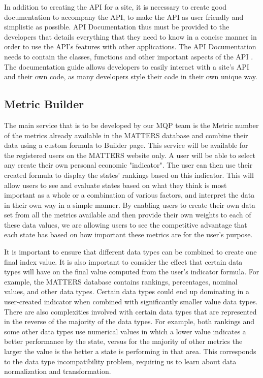 		In addition to creating the API for a site, it is necessary to create 
		good documentation to accompany the API, to make the API as user 
		friendly and simplistic as possible. API Documentation thus must be 
		provided to the developers that details everything that they need to 
		know in a concise manner in order to use the API’s features with other 
		applications. The API Documentation needs to contain the classes, 
		functions and other important aspects of the API \cite{cio}. The 
		documentation guide allows developers to easily interact with a site's 
		API and their own code, as many developers style their code in their own 
		unique way. 

	\subsection{Metric Builder}

		The main service that is to be developed by our MQP team is the Metric 
		number of the metrics already available in the MATTERS database and 
		combine their data using a custom formula to Builder page. This service 
		will be available for the registered users on the MATTERS website only. 
		A user will be able to select any create their own personal economic 
		"indicator". The user can then use their created formula to display the 
		states' rankings based on this indicator. This will allow users to see 
		and evaluate states based on what they think is most important as a 
		whole or a combination of various factors, and interpret the data in 
		their own way in a simple manner. By enabling users to create their own 
		data set from all the metrics available and then provide their own 
		weights to each of these data values, we are allowing users to see the 
		competitive advantage that each state has based on how important these 
		metrics are for the user's purpose.

		It is important to ensure that different data types can be combined to 
		create one final index value. It is also important to consider the 
		effect that certain data types will have on the final value computed 
		from the user's indicator formula. For example, the MATTERS database 
		contains rankings, percentages, nominal values, and other data types. 
		Certain data types could end up dominating in a user-created indicator 
		when combined with significantly smaller value data types. There are 
		also complexities involved with certain data types that are represented 
		in the reverse of the majority of the data types. For example, both 
		rankings and some other data types use numerical values in which a lower 
		value indicates a better performance by the state, versus for the 
		majority of other metrics the larger the value is the better a state is 
		performing in that area. This corresponds to the data type 
		incompatibility problem, requiring us to learn about data normalization 
		and transformation. 

